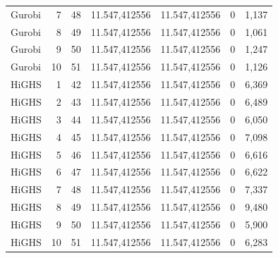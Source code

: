 \documentclass[12pt,a4paper,oneside]{article}
\begin{document}
{\begin{longtable}{lrrrrrr}
Gurobi & 7 & 48 & 11.547,412556 & 11.547,412556 & 0 & 1,137 \\
Gurobi & 8 & 49 & 11.547,412556 & 11.547,412556 & 0 & 1,061 \\
Gurobi & 9 & 50 & 11.547,412556 & 11.547,412556 & 0 & 1,247 \\
Gurobi & 10 & 51 & 11.547,412556 & 11.547,412556 & 0 & 1,126 \\
HiGHS & 1 & 42 & 11.547,412556 & 11.547,412556 & 0 & 6,369 \\
HiGHS & 2 & 43 & 11.547,412556 & 11.547,412556 & 0 & 6,489 \\
HiGHS & 3 & 44 & 11.547,412556 & 11.547,412556 & 0 & 6,050 \\
HiGHS & 4 & 45 & 11.547,412556 & 11.547,412556 & 0 & 7,098 \\
HiGHS & 5 & 46 & 11.547,412556 & 11.547,412556 & 0 & 6,616 \\
HiGHS & 6 & 47 & 11.547,412556 & 11.547,412556 & 0 & 6,622 \\
HiGHS & 7 & 48 & 11.547,412556 & 11.547,412556 & 0 & 7,337 \\
HiGHS & 8 & 49 & 11.547,412556 & 11.547,412556 & 0 & 9,480 \\
HiGHS & 9 & 50 & 11.547,412556 & 11.547,412556 & 0 & 5,900 \\
HiGHS & 10 & 51 & 11.547,412556 & 11.547,412556 & 0 & 6,283 \\
\end{longtable}}

\clearpage
\end{document}
